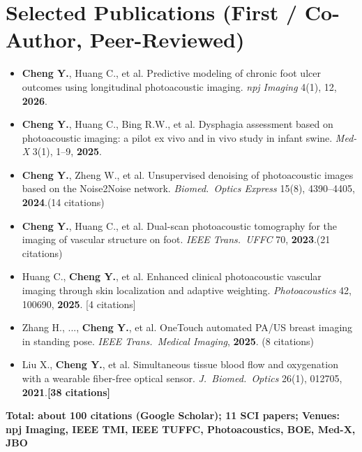 \documentclass[letterpaper,10pt]{article}
\begin{document}
\section{Selected Publications (First / Co-Author, Peer-Reviewed)}

\begin{itemize}[leftmargin=0.2in, itemsep=1pt]
  \item \small \textbf{Cheng Y.}, Huang C., et al. Predictive modeling of chronic foot ulcer outcomes using longitudinal photoacoustic imaging. \textit{npj Imaging} 4(1), 12, \textbf{2026}.
  \item \small \textbf{Cheng Y.}, Huang C., Bing R.W., et al. Dysphagia assessment based on photoacoustic imaging: a pilot ex vivo and in vivo study in infant swine. \textit{Med-X} 3(1), 1--9, \textbf{2025}.
  \item \small \textbf{Cheng Y.}, Zheng W., et al. Unsupervised denoising of photoacoustic images based on the Noise2Noise network. \textit{Biomed.\ Optics Express} 15(8), 4390--4405, \textbf{2024}.\quad(14 citations)
  \item \small \textbf{Cheng Y.}, Huang C., et al. Dual-scan photoacoustic tomography for the imaging of vascular structure on foot. \textit{IEEE Trans.\ UFFC} 70, \textbf{2023}.\quad(21 citations)
  \item \small Huang C., \textbf{Cheng Y.}, et al. Enhanced clinical photoacoustic vascular imaging through skin localization and adaptive weighting. \textit{Photoacoustics} 42, 100690, \textbf{2025}. [4 citations]
  \item \small Zhang H., ..., \textbf{Cheng Y.}, et al. OneTouch automated PA/US breast imaging in standing pose. \textit{IEEE Trans.\ Medical Imaging}, \textbf{2025}. (8 citations)
  \item \small Liu X., \textbf{Cheng Y.}, et al. Simultaneous tissue blood flow and oxygenation with a wearable fiber-free optical sensor. \textit{J.\ Biomed.\ Optics} 26(1), 012705, \textbf{2021}.\quad\textbf{[38 citations]}
\end{itemize}
\vspace{2pt}
\noindent\small\textbf{Total: about 100 citations (Google Scholar); 11 SCI papers; Venues: npj Imaging, IEEE TMI, IEEE TUFFC, Photoacoustics, BOE, Med-X, JBO}

\vspace{-2pt}

\end{document}
